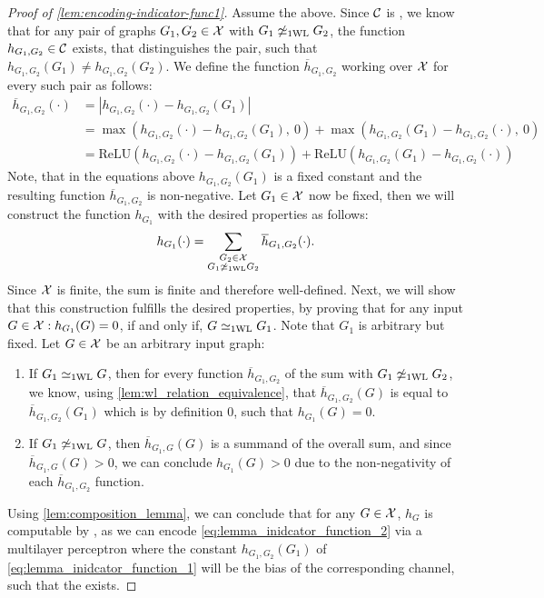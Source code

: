 \begin{proof}[Proof of \cref{lem:encoding-indicator-func1}]
    Assume the above. Since $\mathcal{C}$ is \wldisc, we know that for any pair of graphs $G_1, G_2 \in \mathcal{X}$ with $G_1 \not\simeq_{\text{1WL}} G_2$, the function $h_{G_1, G_2} \in \mathcal{C}$ exists, that distinguishes the pair, such that $h_{G_1, G_2}(G_1) \neq h_{G_1, G_2}(G_2)$. We define the function $\overline{h}_{G_1,G_2}$ working over $\mathcal{X}$ for every such pair as follows:
    \begin{align}\label{eq:lemma_inidcator_function_1}
        \overline{h}_{G_1, G_2}(\cdot) &= |h_{G_1, G_2}(\cdot) - h_{G_1, G_2}(G_1)| \nonumber\\
        &= \max(h_{G_1, G_2}(\cdot) - h_{G_1, G_2}(G_1), \ 0) + \max(h_{G_1, G_2}(G_1) - h_{G_1, G_2}(\cdot), \ 0) \nonumber\\
        &= \text{ReLU}(h_{G_1, G_2}(\cdot) - h_{G_1, G_2}(G_1)) + \text{ReLU}(h_{G_1, G_2}(G_1) - h_{G_1, G_2}(\cdot))
    \end{align}
    Note, that in the equations above $h_{G_1, G_2}(G_1)$ is a fixed constant and the resulting function $\overline{h}_{G_1, G_2}$ is non-negative.
    Let $G_1 \in \mathcal{X}$ now be fixed, then we will construct the function $h_{G_1}$ with the desired properties as follows:
    \begin{align}\label{eq:lemma_inidcator_function_2}
        h_{G_1}(\cdot) = \sum_{\substack{G_2 \in \mathcal{X} \\ G_1 \not\simeq_{\text{1WL}} G_2}} \overline{h}_{G_1, G_2}(\cdot).
    \end{align}
    Since $\mathcal{X}$ is finite, the sum is finite and therefore well-defined. Next, we will show that this construction fulfills the desired properties, by proving that for any input $G \in \mathcal{X}: h_{G_1}(G) = 0$, if and only if, $G \simeq_{\text{1WL}} G_1$. Note that $G_1$ is arbitrary but fixed. Let $G \in \mathcal{X}$ be an arbitrary input graph:
    \begin{enumerate}
        \item If $G_1 \simeq_{\text{1WL}} G$, then for every function $\overline{h}_{G_1, G_2}$ of the sum with $G_1 \not\simeq_{\text{1WL}} G_2$, we know, using \cref{lem:wl_relation_equivalence}, that $\overline{h}_{G_1, G_2}(G)$ is equal to $\overline{h}_{G_1, G_2}(G_1)$ which is by definition $0$, such that $h_{G_1}(G) = 0$.
        \item If $G_1 \not\simeq_{\text{1WL}} G$, then $\overline{h}_{G_1, G}(G)$ is a summand of the overall sum, and since $\overline{h}_{G_1, G}(G) > 0$, 
        we can conclude $h_{G_1}(G) > 0$ due to the non-negativity of each $\overline{h}_{G_1, G_2}$ function.
    \end{enumerate}
    Using \cref{lem:composition_lemma}, we can conclude that for any $G \in \mathcal{X}$, $h_G$ is computable by \wlnn, as we can encode \cref{eq:lemma_inidcator_function_2} via a multilayer perceptron \mlp where the constant $h_{G_1, G_2}(G_1)$ of \cref{eq:lemma_inidcator_function_1} will be the bias of the corresponding channel, such that the \mlp exists.


\end{proof}

